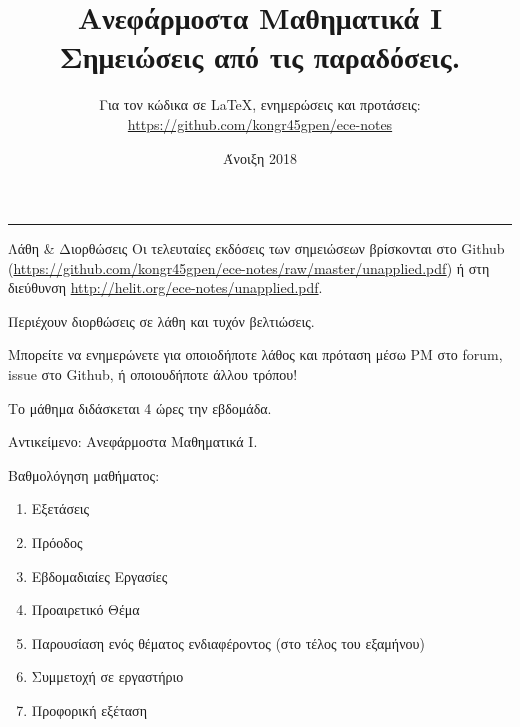 \documentclass[11pt,a4paper,notitlepage,fleqn,final]{article}
\title{Ανεφάρμοστα Μαθηματικά I
	\\
	{ 
		\normalsize Σημειώσεις από τις παραδόσεις.}
	}
\date{Άνοιξη 2018
	\\
	{ 
	}
}
\author{
	Για τον κώδικα σε \LaTeX, ενημερώσεις και προτάσεις:
	\\
	\url{https://github.com/kongr45gpen/ece-notes}}
\begin{document}
\maketitle

\hrule
\vspace{50pt}

\begin{infobox}{Λάθη \& Διορθώσεις}
	Οι τελευταίες εκδόσεις των σημειώσεων βρίσκονται στο Github
	(\url{https://github.com/kongr45gpen/ece-notes/raw/master/unapplied.pdf}) ή
	στη διεύθυνση \url{http://helit.org/ece-notes/unapplied.pdf}.
	
	Περιέχουν διορθώσεις σε λάθη και τυχόν βελτιώσεις.
	
	\tcblower
	
	Μπορείτε να ενημερώνετε για οποιοδήποτε λάθος και πρόταση
	μέσω PM στο forum, issue στο Github, ή οποιουδήποτε άλλου τρόπου!
\end{infobox}

Το μάθημα διδάσκεται 4 ώρες την εβδομάδα.

Αντικείμενο: Ανεφάρμοστα Μαθηματικά I.

Βαθμολόγηση μαθήματος:
\begin{enumerate}
	\item Εξετάσεις
	\item Πρόοδος
	\item Εβδομαδιαίες Εργασίες
	\item Προαιρετικό Θέμα
	\item Παρουσίαση ενός θέματος ενδιαφέροντος (στο τέλος του εξαμήνου)
	\item Συμμετοχή σε εργαστήριο
	\item Προφορική εξέταση
\end{enumerate}
\end{document}
